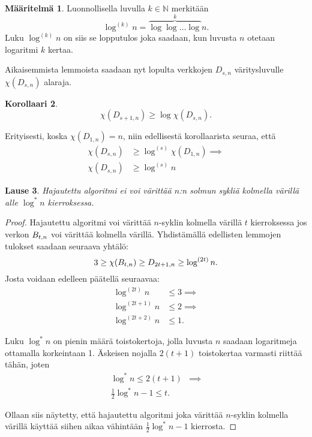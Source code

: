 \documentclass[finnish]{tktltiki2}
\newtheorem{lau}{Lause}
\newtheorem{kor}[lau]{Korollaari}
\theoremstyle{definition}
\newtheorem{maar}[lau]{Määritelmä}
\theoremstyle{remark}
\newcommand{\nat}{\mathbb{N}}
\newcommand{\Dsn}{D_{s,n}}
\newcommand{\Dssn}{D_{s+1,n}}
\begin{document}
\begin{maar}
    Luonnollisella luvulla $k \in \nat$ merkitään
    \begin{equation*}
        \log^{(k)} n = \overbrace{\log \log \dots \log}^{k} n.
    \end{equation*}
    Luku $\log^{(k)} n$ on siis se lopputulos joka saadaan, kun luvusta $n$
    otetaan logaritmi $k$ kertaa.
\end{maar}

Aikaisemmista lemmoista saadaan nyt lopulta verkkojen $\Dsn$ vä\-ri\-tys\-lu\-vul\-le
$\chi(\Dsn)$ alaraja.

\begin{kor}
    \begin{equation*}
        \chi(\Dssn) \geq \log \chi(\Dsn).
    \end{equation*}
\end{kor}

Erityisesti, koska $\chi(D_{1,n}) = n$, niin edellisestä korollaarista seuraa, että
%
\begin{align*}
    \chi(\Dsn) &\geq \log^{(s)} \chi(D_{1,n}) \implies \\
    \chi(\Dsn) &\geq \log^{(s)} n
\end{align*}

\begin{lau}
    Hajautettu algoritmi ei voi värittää $n$:n solmun sykliä kolmella värillä
    alle $\log^* n$ kierroksessa.
\end{lau}

\begin{proof}
    Hajautettu algoritmi voi värittää $n$-syklin kolmella värillä $t$
    kierroksessa jos verkon $B_{t,n}$ voi värittää kolmella värillä. Yhdistämällä
    edellisten lemmojen tulokset saadaan seuraava yhtälö:
    \begin{equation*}
        3 \geq \chi(B_{t,n}) \geq D_{2t+1, n} \geq \log^{(2t)} n.
    \end{equation*}
    Josta voidaan edelleen päätellä seuraavaa:
    \begin{align*}
        \log^{(2t)}   n &\leq 3 \implies \\
        \log^{(2t+1)} n &\leq 2 \implies \\
        \log^{(2t+2)} n &\leq 1.
    \end{align*}

    Luku $\log^* n$ on pienin määrä toistokertoja, jolla luvusta $n$ saadaan
    logaritmeja ottamalla korkeintaan 1. Äskeisen nojalla $2(t+1)$ toistokertaa
    varmasti riittää tähän, joten
    \begin{align*}
        \log^* n \leq 2(t+1)            & \implies \\
        \frac{1}{2} \log^* n - 1 \leq t. &
    \end{align*}

    Ollaan siis näytetty, että hajautettu algoritmi joka värittää $n$-syklin
    kolmella värillä käyttää siihen aikaa vähintään $\frac{1}{2} \log^* n - 1$
    kierrosta.

\end{proof}
\end{document}
